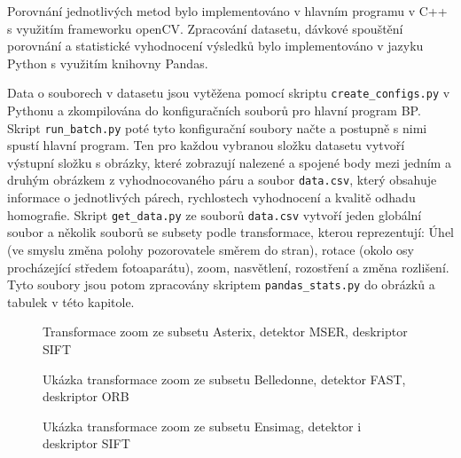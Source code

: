 
Porovnání jednotlivých metod bylo implementováno v hlavním programu v C++ s využitím frameworku
openCV. Zpracování datasetu, dávkové spouštění porovnání a statistické vyhodnocení výsledků bylo
implementováno v jazyku Python s využitím knihovny Pandas.


Data o souborech v datasetu jsou vytěžena pomocí skriptu \verb|create_configs.py| v Pythonu a zkompilována do konfiguračních souborů pro hlavní program BP. Skript \verb|run_batch.py| poté tyto konfigurační soubory načte a postupně s nimi spustí hlavní program. Ten pro každou vybranou složku datasetu vytvoří výstupní složku s obrázky, které zobrazují nalezené a spojené body mezi jedním a druhým obrázkem z vyhodnocovaného páru a soubor \verb|data.csv|, který obsahuje informace o jednotlivých párech, rychlostech vyhodnocení a kvalitě odhadu homografie. Skript \verb|get_data.py| ze souborů \verb|data.csv| vytvoří jeden globální soubor a několik souborů se subsety podle transformace, kterou reprezentují: Úhel (ve smyslu změna polohy pozorovatele směrem do stran), rotace (okolo osy procházející středem fotoaparátu), zoom, nasvětlení, rozostření a změna rozlišení. Tyto soubory jsou potom zpracovány skriptem \verb|pandas_stats.py| do obrázků a tabulek v této kapitole.





\begin{figure}[htp] 
	\caption{Transformace zoom ze subsetu Asterix, detektor MSER,
		deskriptor SIFT} \label{ex_asterix}
\end{figure}

\begin{figure}[htp] 
	\caption{Ukázka transformace zoom ze subsetu Belledonne, detektor FAST,
		deskriptor ORB}	\label{ex_belledonne}
\end{figure}

\begin{figure}[htp] 
	\caption{Ukázka transformace zoom ze subsetu Ensimag, detektor i 
		deskriptor SIFT} \label{ex_ensimag}
\end{figure}

